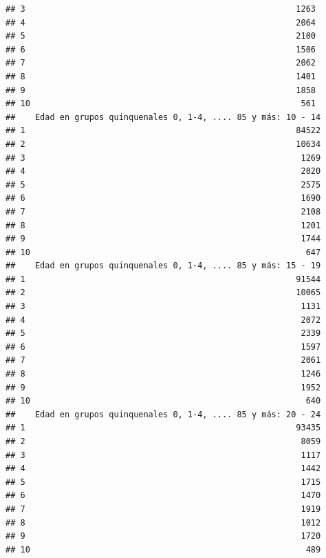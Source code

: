\documentclass[11pt,]{article}
\begin{document}
\begin{verbatim}
## 3                                                       1263
## 4                                                       2064
## 5                                                       2100
## 6                                                       1506
## 7                                                       2062
## 8                                                       1401
## 9                                                       1858
## 10                                                       561
##    Edad en grupos quinquenales 0, 1-4, .... 85 y más: 10 - 14
## 1                                                       84522
## 2                                                       10634
## 3                                                        1269
## 4                                                        2020
## 5                                                        2575
## 6                                                        1690
## 7                                                        2108
## 8                                                        1201
## 9                                                        1744
## 10                                                        647
##    Edad en grupos quinquenales 0, 1-4, .... 85 y más: 15 - 19
## 1                                                       91544
## 2                                                       10065
## 3                                                        1131
## 4                                                        2072
## 5                                                        2339
## 6                                                        1597
## 7                                                        2061
## 8                                                        1246
## 9                                                        1952
## 10                                                        640
##    Edad en grupos quinquenales 0, 1-4, .... 85 y más: 20 - 24
## 1                                                       93435
## 2                                                        8059
## 3                                                        1117
## 4                                                        1442
## 5                                                        1715
## 6                                                        1470
## 7                                                        1919
## 8                                                        1012
## 9                                                        1720
## 10                                                        489

\end{verbatim}
\end{document}
